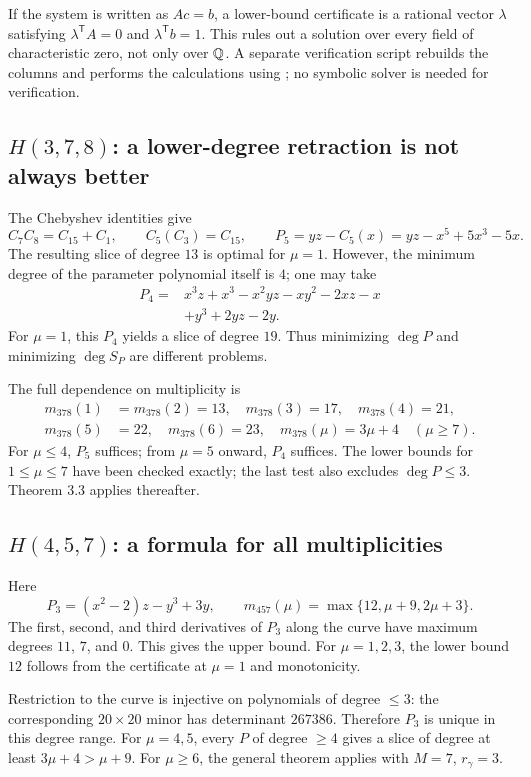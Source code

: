 If the system is written as $A c=b$, a lower-bound certificate is a rational vector $\lambda$ satisfying $\lambda^{\mathsf T}A=0$ and $\lambda^{\mathsf T}b=1$. This rules out a solution over every field of characteristic zero, not only over ${\mathbb{Q}}$. A separate verification script rebuilds the columns and performs the calculations using ; no symbolic solver is needed for verification.

\subsection*{$H(3,7,8)$: a lower-degree retraction is not always better}
The Chebyshev identities give
\[
C_7C_8=C_{15}+C_1,\qquad C_5(C_3)=C_{15},\qquad
P_5=yz-C_5(x)=yz-x^5+5x^3-5x.
\]
The resulting slice of degree $13$ is optimal for $\mu=1$. However, the minimum degree of the parameter polynomial itself is $4$; one may take
\[
\begin{split}
P_4={}&x^3z+x^3-x^2yz-xy^2-2xz-x\\
&+y^3+2yz-2y.
\end{split}
\]
For $\mu=1$, this $P_4$ yields a slice of degree $19$. Thus minimizing $\deg P$ and minimizing $\deg S_P$ are different problems.

The full dependence on multiplicity is
\[
\boxed{\begin{aligned}
m_{378}(1)&=m_{378}(2)=13,\quad m_{378}(3)=17,\quad m_{378}(4)=21,\\
m_{378}(5)&=22,\quad m_{378}(6)=23,\quad
m_{378}(\mu)=3\mu+4\quad(\mu\ge7).
\end{aligned}}
\]
For $\mu\le4$, $P_5$ suffices; from $\mu=5$ onward, $P_4$ suffices. The lower bounds for $1\le\mu\le7$ have been checked exactly; the last test also excludes $\deg P\le3$. Theorem 3.3 applies thereafter.

\subsection*{$H(4,5,7)$: a formula for all multiplicities}
Here
\[
P_3=(x^2-2)z-y^3+3y,\qquad
\boxed{m_{457}(\mu)=\max\{12,\mu+9,2\mu+3\}.}
\]
The first, second, and third derivatives of $P_3$ along the curve have maximum degrees $11$, $7$, and $0$. This gives the upper bound. For $\mu=1,2,3$, the lower bound $12$ follows from the certificate at $\mu=1$ and monotonicity.

Restriction to the curve is injective on polynomials of degree $\le3$: the corresponding $20\times20$ minor has determinant $267386$. Therefore $P_3$ is unique in this degree range. For $\mu=4,5$, every $P$ of degree $\ge4$ gives a slice of degree at least $3\mu+4>\mu+9$. For $\mu\ge6$, the general theorem applies with $M=7$, $r_\gamma=3$.

